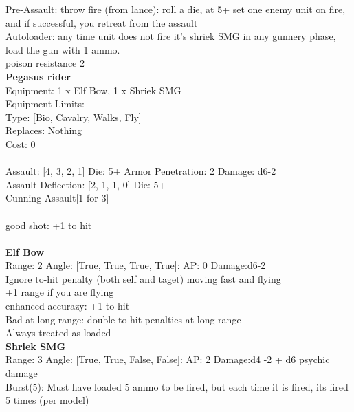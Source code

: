 \noindent Pre-Assault: throw fire (from lance): roll a die, at 5+ set one enemy unit on fire, and if successful, you retreat from the assault\\ 
Autoloader: any time unit does not fire it's shriek SMG in any gunnery phase, load the gun with 1 ammo.\\ 
poison resistance 2\\ 


{\bf Pegasus rider } \\
Equipment: 1 x Elf Bow, 1 x Shriek SMG \\
Equipment Limits:  \\
Type: [Bio, Cavalry, Walks, Fly] \\
Replaces: Nothing \\
Cost: 0\\
\ \\
Assault: [4, 3, 2, 1] Die: 5+ Armor Penetration: 2 Damage: d6-2 \\
Assault Deflection: [2, 1, 1, 0] Die: 5+\\
\indent Cunning Assault[1 for 3]\\ 
 
\ \\
good shot: +1 to hit\\ 

\ \\
{\bf Elf Bow } \\



Range: 2  Angle: [True, True, True, True]: AP: 0 Damage:d6-2 \\
Ignore to-hit penalty (both self and taget) moving fast and flying\\ 
+1 range if you are flying\\ 
enhanced accurazy: +1 to hit\\ 
Bad at long range: double to-hit penalties at long range\\ 
Always treated as loaded\\ 




{\bf Shriek SMG } \\



Range: 3  Angle: [True, True, False, False]: AP: 2 Damage:d4 -2 + d6 psychic damage \\
Burst(5): Must have loaded 5 ammo to be fired, but each time it is fired, its fired 5 times (per model)\\ 




